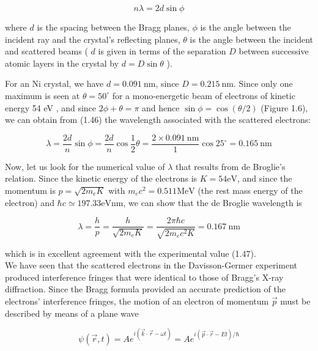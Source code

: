 \documentclass[10pt]{article}
\begin{document}
\begin{equation*}
n \lambda=2 d \sin \phi \tag{1.46}
\end{equation*}


where $d$ is the spacing between the Bragg planes, $\phi$ is the angle between the incident ray and the crystal's reflecting planes, $\theta$ is the angle between the incident and scattered beams ( $d$ is given in terms of the separation $D$ between successive atomic layers in the crystal by $d=D \sin \theta$ ).

For an Ni crystal, we have $d=0.091 \mathrm{~nm}$, since $D=0.215 \mathrm{~nm}$. Since only one maximum is seen at $\theta=50^{\circ}$ for a mono-energetic beam of electrons of kinetic energy 54 eV , and since $2 \phi+\theta=\pi$ and hence $\sin \phi=\cos (\theta / 2)$ (Figure 1.6), we can obtain from (1.46) the wavelength associated with the scattered electrons:


\begin{equation*}
\lambda=\frac{2 d}{n} \sin \phi=\frac{2 d}{n} \cos \frac{1}{2} \theta=\frac{2 \times 0.091 \mathrm{~nm}}{1} \cos 25^{\circ}=0.165 \mathrm{~nm} \tag{1.47}
\end{equation*}


Now, let us look for the numerical value of $\lambda$ that results from de Broglie's relation. Since the kinetic energy of the electrons is $K=54 \mathrm{eV}$, and since the momentum is $p=\sqrt{2 m_{e} K}$ with $m_{e} c^{2}=0.511 \mathrm{MeV}$ (the rest mass energy of the electron) and $\hbar c \simeq 197.33 \mathrm{eV} \mathrm{nm}$, we can show that the de Broglie wavelength is


\begin{equation*}
\lambda=\frac{h}{p}=\frac{h}{\sqrt{2 m_{e} K}}=\frac{2 \pi \hbar c}{\sqrt{2 m_{e} c^{2} K}}=0.167 \mathrm{~nm} \tag{1.48}
\end{equation*}


which is in excellent agreement with the experimental value (1.47).\\
We have seen that the scattered electrons in the Davisson-Germer experiment produced interference fringes that were identical to those of Bragg's X-ray diffraction. Since the Bragg formula provided an accurate prediction of the electrons' interference fringes, the motion of an electron of momentum $\vec{p}$ must be described by means of a plane wave


\begin{equation*}
\psi(\vec{r}, t)=A e^{i(\vec{k} \cdot \vec{r}-\omega t)}=A e^{i(\vec{p} \cdot \vec{r}-E t) / \hbar} \tag{1.49}
\end{equation*}
\end{document}
